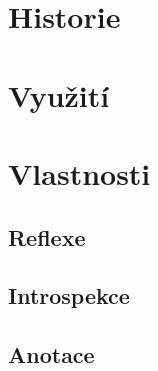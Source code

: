\section{Historie}
\section{Využití}
\section{Vlastnosti}
\subsection{Reflexe}
\subsection{Introspekce}
\subsection{Anotace}
